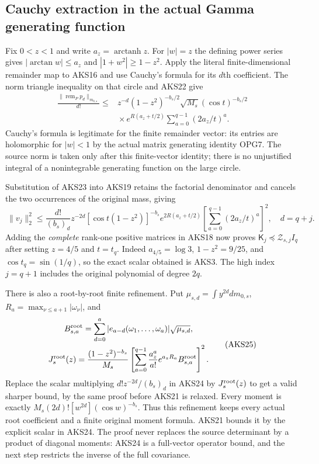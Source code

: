 \documentclass[11pt,a4paper]{article}
\begin{document}
\subsection{Cauchy extraction in the actual Gamma generating function}
Fix $0<z<1$ and write $a_z=\operatorname{arctanh}z$.
For $|w|=z$ the defining power series gives
$|\arctan w|\le a_z$ and $|1+w^2|\ge1-z^2$.
Apply the literal finite-dimensional remainder map to AKS16 and use
Cauchy's formula for its $d$th coefficient. The norm triangle inequality
on that circle and AKS22 give
\[
\begin{split}
 \frac{\|\operatorname{rem}_P p_d\|_{m_{0,s}}}{d!}
 \le{}&z^{-d}(1-z^2)^{-b_s/2}\sqrt{M_s}(\cos t)^{-b_s/2}\\
 &\mathrel{}\times e^{R(a_z+t/2)}
                    \sum_{a=0}^{q-1}(2a_z/t)^a.
\end{split}\tag{AKS23}
\]
Cauchy's formula is legitimate for the finite remainder vector: its
entries are holomorphic for $|w|<1$ by the actual matrix generating
identity OPG7. The source norm is taken only after this finite-vector
identity; there is no unjustified integral of a nonintegrable generating
function on the large circle.

Substitution of AKS23 into AKS19 retains the factorial denominator and
cancels the two occurrences of the original mass, giving
\[
 \boxed{\ 
 \|v_j\|_2^2\le\frac{d!}{(b_s)_d}z^{-2d}
 [\cos t(1-z^2)]^{-b_s}e^{2R(a_z+t/2)}
 \left[\sum_{a=0}^{q-1}(2a_z/t)^a\right]^2,
 \quad d=q+j.\ }
 \tag{AKS24}
\]
Adding the \emph{complete} rank-one positive matrices in AKS18 now proves
$\mathsf K_j\preceq \mathcal Z_{s,j}I_q$ after setting $z=4/5$ and $t=t_q$.
Indeed $a_{4/5}=\log3$, $1-z^2=9/25$, and $\cos t_q=\sin(1/q)$, so
the exact scalar obtained is AKS3. The high index $j=q+1$ includes the
original polynomial of degree $2q$.

There is also a root-by-root finite refinement. Put
$\mu_{s,d}=\int y^{2d}dm_{0,s}$,
$R_a=\max_{\nu\le a+1}|\omega_\nu|$, and
\[
\begin{gathered}
 B_{s,a}^{\rm root}=\sum_{d=0}^a
     |e_{a-d}(\omega_1,\ldots,\omega_a)|\sqrt{\mu_{s,d}},\\
 J_s^{\rm root}(z)=\frac{(1-z^2)^{-b_s}}{M_s}
 \left[\sum_{a=0}^{q-1}\frac{a_z^a}{a!}e^{a_zR_a}
                      B_{s,a}^{\rm root}\right]^2.
\end{gathered}\tag{AKS25}
\]
Replace the scalar multiplying
$d!z^{-2d}/(b_s)_d$ in AKS24 by $J_s^{\rm root}(z)$ to get a valid
sharper bound, by the same proof before AKS21 is relaxed. Every moment
is exactly $M_s(2d)![w^{2d}](\cos w)^{-b_s}$. Thus this refinement keeps
every actual root coefficient and a finite original moment formula.
AKS21 bounds it by the explicit scalar in AKS24. The proof never replaces
the source determinant by a product of diagonal moments: AKS24 is a
full-vector operator bound, and the next step restricts the inverse of
the full covariance.
\end{document}
